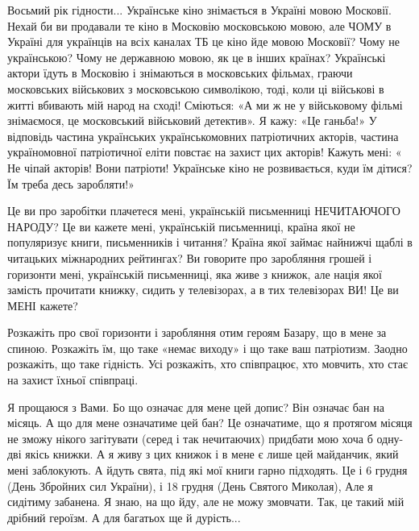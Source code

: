 Восьмий рік гідности... Українське кіно знімається в Україні мовою Московії.
Нехай би ви продавали те кіно в Московію московською мовою, але ЧОМУ в Україні
для українців на всіх каналах ТБ це кіно йде мовою Московії?  Чому не
українською? Чому не державною мовою, як це в інших країнах? Українські актори
їдуть в Московію і знімаються в московських фільмах, граючи московських
військових з московською символікою, тоді, коли ці військові в житті вбивають
мій народ на сході! Сміються: «А ми ж не у військовому фільмі знімаємося, це
московський військовий детектив». Я кажу: «Це ганьба!» У відповідь частина
українських українськомовних патріотичних акторів, частина україномовної
патріотичної еліти повстає на захист цих акторів! Кажуть мені: « Не чіпай
акторів! Вони патріоти! Українське кіно не розвивається, куди їм дітися? Їм
треба десь заробляти!»

Це ви про заробітки плачетеся мені, українській письменниці НЕЧИТАЮЧОГО НАРОДУ?
Це ви кажете мені, українській письменниці, країна якої не популяризує книги,
письменників і читання? Країна якої займає найнижчі щаблі в читацьких
міжнародних рейтингах? Ви говорите про заробляння грошей і горизонти мені,
українській письменниці, яка живе з книжок, але нація якої замість прочитати
книжку, сидить у телевізорах, а в тих телевізорах ВИ! Це ви МЕНІ кажете? 

Розкажіть про свої горизонти і заробляння отим героям Базару, що в мене за
спиною. Розкажіть їм, що таке «немає виходу» і що таке ваш патріотизм. Заодно
розкажіть, що таке гідність. Усі розкажіть, хто співпрацює, хто мовчить, хто
стає на захист їхньої співпраці. 

Я прощаюся з Вами. Бо що означає для мене цей допис? Він означає бан на місяць.
А що для мене означатиме цей бан? Це означатиме, що я протягом місяця не зможу
нікого загітувати (серед і так нечитаючих) придбати мою хоча б одну-дві якісь
книжки. А я живу з цих книжок і в мене є лише цей майданчик, який мені
заблокують. А йдуть свята, під які мої книги гарно підходять. Це і 6 грудня
(День Збройних сил України), і 18 грудня (День Святого Миколая), Але я сидітиму
забанена. Я знаю, на що йду, але не можу змовчати. Так, це такий мій дрібний
героїзм. А для багатьох ще й дурість...

